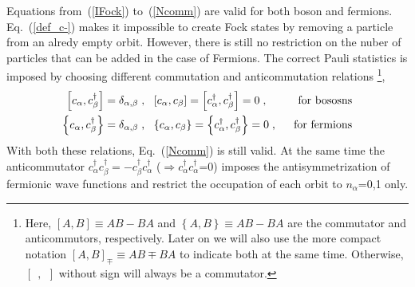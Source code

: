 Equations from~(\ref{IFock}) to~(\ref{Ncomm}) are valid for both boson and fermions. Eq.~(\ref{def_c-}) makes it impossible to create Fock states by removing a particle from an alredy empty orbit. However, there is still no restriction on the nuber of particles that can be added in the case of Fermions. The correct Pauli statistics is imposed by choosing different commutation and anticommutation relations%
\footnote{Here, $\left[ A, B \right]\equiv AB-BA$ and $\left\{ A, B \right\}\equiv AB-BA$ are the
commutator and anticommutors, respectively. Later on we will also use the more compact notation
$\left[ A, B \right]_\mp \equiv AB \mp BA$ to indicate both at the same time.
Otherwise, $\left[ ~~ , ~~ \right]$ without sign will always be a commutator. },
\begin{eqnarray}
  \left[ c_\alpha , c^\dag_\beta \right] = \delta_{\alpha,\beta} \; , ~ ~ 
 &\left[ c_\alpha , c_\beta \right] = \left[ c^\dag_\alpha , c^\dag_\beta \right] = 0  \; ,
 &  ~ ~  \hbox{for bososns}
 \label{comm_rel}
\\
  \left\{ c_\alpha , c^\dag_\beta \right\} = \delta_{\alpha,\beta} \; , ~ ~ 
 &\left\{ c_\alpha , c_\beta \right\} = \left\{ c^\dag_\alpha , c^\dag_\beta \right\} = 0  \; ,
 &  ~ ~  \hbox{for fermions}
 \label{anticomm_rel}
\end{eqnarray}
With both these relations, Eq.~(\ref{Ncomm}) is still valid. At the same time the anticommutator
$c^\dag_\alpha c^\dag_\beta = - c^\dag_\beta c^\dag_\alpha$ ($\Rightarrow c^\dag_\alpha c^\dag_\alpha$=0)
imposes the antisymmetrization of fermionic wave functions and restrict the occupation of each orbit to $n_\alpha$=0,1 only.


